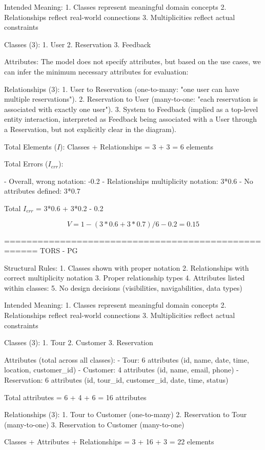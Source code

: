 Intended Meaning:
1. Classes represent meaningful domain concepts
2. Relationships reflect real-world connections
3. Multiplicities reflect actual constraints

Classes (3):
1. User
2. Reservation
3. Feedback

Attributes:
The model does not specify attributes, but based on the use cases, we can infer the minimum necessary attributes for evaluation:

Relationships (3):
1. User to Reservation (one-to-many: "one user can have multiple reservations").
2. Reservation to User (many-to-one: "each reservation is associated with exactly one user").
3. System to Feedback (implied as a top-level entity interaction, interpreted as Feedback being associated with a User through a Reservation, but not explicitly clear in the diagram).

Total Elements (\( I \)):
Classes + Relationships = 3  + 3 = 6 elements

Total Errors (\( I_{err} \)):

- Overall, wrong notation: -0.2
- Relationships multiplicity notation: 3*0.6
- No attributes defined: 3*0.7

Total \( I_{err} \) = 3*0.6 + 3*0.2  - 0.2

\[
V = 1 - (3*0.6 + 3*0.7)/6 - 0.2 = 0.15
\]

====================================================
TORS - PG

Structural Rules:
1. Classes shown with proper notation
2. Relationships with correct multiplicity notation
3. Proper relationship types
4. Attributes listed within classes: 
5. No design decisions (visibilities, navigabilities, data types)

Intended Meaning:
1. Classes represent meaningful domain concepts
2. Relationships reflect real-world connections
3. Multiplicities reflect actual constraints

Classes (3):
1. Tour
2. Customer
3. Reservation

Attributes (total across all classes):
- Tour: 6 attributes (id, name, date, time, location, customer_id)
- Customer: 4 attributes (id, name, email, phone)
- Reservation: 6 attributes (id, tour_id, customer_id, date, time, status)

Total attributes = 6 + 4 + 6 = 16 attributes

Relationships (3):
1. Tour to Customer (one-to-many)
2. Reservation to Tour (many-to-one)
3. Reservation to Customer (many-to-one)

Classes + Attributes + Relationships = 3 + 16 + 3 = 22 elements

